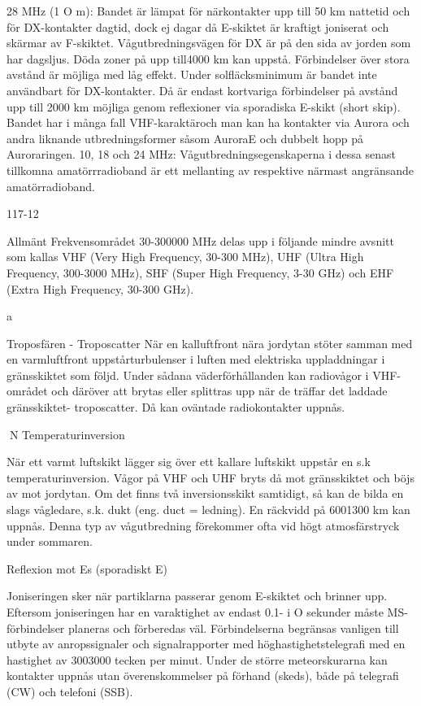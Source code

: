 28 MHz (1 O m):
Bandet är lämpat för närkontakter upp till 50
km nattetid och för DX-kontakter dagtid,
dock ej dagar då E-skiktet är kraftigt joniserat
och skärmar av F-skiktet. Vågutbredningsvägen för DX är på den sida av jorden som
har dagsljus. Döda zoner på upp till4000 km
kan uppstå. Förbindelser över stora avstånd
är möjliga med låg effekt.
Under solfläcksminimum är bandet inte
användbart för DX-kontakter. Då är endast
kortvariga förbindelser på avstånd upp till
2000 km möjliga genom reflexioner via sporadiska E-skikt (short skip).
Bandet har i många fall VHF-karaktäroch
man kan ha kontakter via Aurora och andra
liknande utbredningsformer såsom AuroraE och dubbelt hopp på Auroraringen.
10, 18 och 24 MHz:
Vågutbredningsegenskaperna i dessa senast tillkomna amatörrradioband är ett mellanting av respektive närmast angränsande
amatörradioband.

117-12

Allmänt
Frekvensområdet 30-300000 MHz delas upp
i följande mindre avsnitt som kallas
VHF (Very High Frequency, 30-300 MHz),
UHF (Ultra High Frequency, 300-3000 MHz),
SHF (Super High Frequency, 3-30 GHz) och
EHF (Extra High Frequency, 30-300 GHz).

a

Troposfären - Troposcatter
När en kalluftfront nära jordytan stöter samman med en varmluftfront uppstårturbulenser
i luften med elektriska uppladdningar i gränsskiktet som följd.
Under sådana väderförhållanden kan
radiovågor i VHF-området och däröver att
brytas eller splittras upp när de träffar det
laddade gränsskiktet- troposcatter. Då kan
oväntade radiokontakter uppnås.

N
Temperaturinversion

När ett varmt luftskikt lägger sig över ett
kallare luftskikt uppstår en s.k temperaturinversion.
Vågor på VHF och UHF bryts då mot
gränsskiktet och böjs av mot jordytan. Om
det finns två inversionsskikt samtidigt, så
kan de bilda en slags vågledare, s.k. dukt
(eng. duct = ledning). En räckvidd på 6001300 km kan uppnås. Denna typ av vågutbredning förekommer ofta vid högt atmosfärstryck under sommaren.

Reflexion mot Es (sporadiskt E)

Joniseringen sker när partiklarna passerar genom E-skiktet och brinner upp. Eftersom joniseringen har en varaktighet av endast 0.1- i O sekunder måste MS-förbindelser planeras och förberedas väl. Förbindelserna begränsas vanligen till utbyte av
anropssignaler och signalrapporter med höghastighetstelegrafi med en hastighet av 3003000 tecken per minut. Under de större meteorskurarna kan kontakter uppnås utan överenskommelser på förhand (skeds), både på
telegrafi (CW) och telefoni (SSB).

